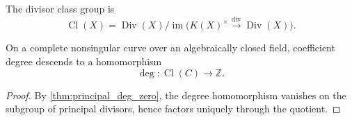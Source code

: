 \begin{definition}
  \label{def:divisor_class_group}
  The divisor class group is
  \[
    \operatorname{Cl}(X)
      =\operatorname{Div}(X)/
        \operatorname{im}\bigl(K(X)^\times
          \xrightarrow{\operatorname{div}}\operatorname{Div}(X)\bigr).
  \]
\end{definition}

\begin{theorem}
  \label{thm:divisor_class_group_degree}
  On a complete nonsingular curve over an algebraically closed field,
  coefficient degree descends to a homomorphism
  \[
    \deg\colon\operatorname{Cl}(C)\longrightarrow\mathbb Z.
  \]
\end{theorem}
\begin{proof}
  By \cref{thm:principal_deg_zero}, the degree homomorphism vanishes on the
  subgroup of principal divisors, hence factors uniquely through the
  quotient.
\end{proof}

